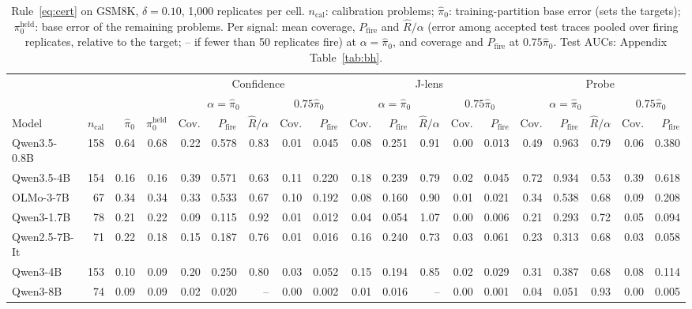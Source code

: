\begin{table}[t]
\centering\scriptsize
\caption{Rule~\eqref{eq:cert} on GSM8K, $\delta=0.10$, 1{,}000 replicates per cell. $n_{\mathrm{cal}}$: calibration problems; $\hat\pi_0$: training-partition base error (sets the targets); $\pi_0^{\mathrm{held}}$: base error of the remaining problems. Per signal: mean coverage, $P_{\mathrm{fire}}$ and $\hat R/\alpha$ (error among accepted test traces pooled over firing replicates, relative to the target; -- if fewer than 50 replicates fire) at $\alpha=\hat\pi_0$, and coverage and $P_{\mathrm{fire}}$ at $0.75\hat\pi_0$. Test AUCs: Appendix Table~\ref{tab:bh}.}
\label{tab:main}
\setlength{\tabcolsep}{2.6pt}
\begin{tabular}{lrrr rrrrr rrrrr rrrrr}
\toprule
 & & & & \multicolumn{5}{c}{Confidence} & \multicolumn{5}{c}{J-lens} & \multicolumn{5}{c}{Probe} \\
\cmidrule(lr){5-9}\cmidrule(lr){10-14}\cmidrule(lr){15-19}
 & & & & \multicolumn{3}{c}{$\alpha=\hat\pi_0$} & \multicolumn{2}{c}{$0.75\hat\pi_0$} & \multicolumn{3}{c}{$\alpha=\hat\pi_0$} & \multicolumn{2}{c}{$0.75\hat\pi_0$} & \multicolumn{3}{c}{$\alpha=\hat\pi_0$} & \multicolumn{2}{c}{$0.75\hat\pi_0$} \\
\cmidrule(lr){5-7}\cmidrule(lr){8-9}\cmidrule(lr){10-12}\cmidrule(lr){13-14}\cmidrule(lr){15-17}\cmidrule(lr){18-19}
Model & $n_{\mathrm{cal}}$ & $\hat\pi_0$ & $\pi_0^{\mathrm{held}}$ & Cov. & $P_{\mathrm{fire}}$ & $\hat R/\alpha$ & Cov. & $P_{\mathrm{fire}}$ & Cov. & $P_{\mathrm{fire}}$ & $\hat R/\alpha$ & Cov. & $P_{\mathrm{fire}}$ & Cov. & $P_{\mathrm{fire}}$ & $\hat R/\alpha$ & Cov. & $P_{\mathrm{fire}}$ \\
\midrule
Qwen3.5-0.8B & 158 & 0.64 & 0.68 & 0.22 & 0.578 & 0.83 & 0.01 & 0.045 & 0.08 & 0.251 & 0.91 & 0.00 & 0.013 & 0.49 & 0.963 & 0.79 & 0.06 & 0.380 \\
Qwen3.5-4B & 154 & 0.16 & 0.16 & 0.39 & 0.571 & 0.63 & 0.11 & 0.220 & 0.18 & 0.239 & 0.79 & 0.02 & 0.045 & 0.72 & 0.934 & 0.53 & 0.39 & 0.618 \\
OLMo-3-7B & 67 & 0.34 & 0.34 & 0.33 & 0.533 & 0.67 & 0.10 & 0.192 & 0.08 & 0.160 & 0.90 & 0.01 & 0.021 & 0.34 & 0.538 & 0.68 & 0.09 & 0.208 \\
Qwen3-1.7B & 78 & 0.21 & 0.22 & 0.09 & 0.115 & 0.92 & 0.01 & 0.012 & 0.04 & 0.054 & 1.07 & 0.00 & 0.006 & 0.21 & 0.293 & 0.72 & 0.05 & 0.094 \\
Qwen2.5-7B-It & 71 & 0.22 & 0.18 & 0.15 & 0.187 & 0.76 & 0.01 & 0.016 & 0.16 & 0.240 & 0.73 & 0.03 & 0.061 & 0.23 & 0.313 & 0.68 & 0.03 & 0.058 \\
Qwen3-4B & 153 & 0.10 & 0.09 & 0.20 & 0.250 & 0.80 & 0.03 & 0.052 & 0.15 & 0.194 & 0.85 & 0.02 & 0.029 & 0.31 & 0.387 & 0.68 & 0.08 & 0.114 \\
Qwen3-8B & 74 & 0.09 & 0.09 & 0.02 & 0.020 & -- & 0.00 & 0.002 & 0.01 & 0.016 & -- & 0.00 & 0.001 & 0.04 & 0.051 & 0.93 & 0.00 & 0.005 \\
\bottomrule
\end{tabular}
\end{table}
